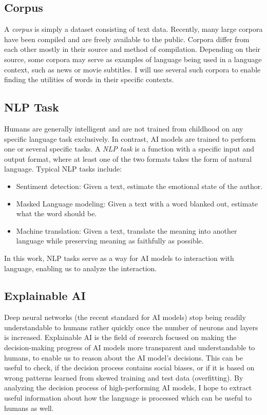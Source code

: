 	\subsection{Corpus}
	      A \textit{corpus} is simply a dataset consisting of text data.
	      Recently, many large corpora have been compiled and are freely available to the public.
	      Corpora differ from each other mostly in their source and method of compilation.
	      Depending on their source, some corpora may serve as examples of language being used in a language context, such as news or movie subtitles.
	      I will use several such corpora to enable finding the utilities of words in their specific contexts.
	\subsection{NLP Task}
	      Humans are generally intelligent and are not trained from childhood on any specific language task exclusively.
	      In contrast, AI models are trained to perform one or several specific tasks.
	      A \textit{NLP task} is a function with a specific input and output format, where at least one of the two formats takes the form of natural language.
	      Typical NLP tasks include:

	      \begin{itemize}
		      \item Sentiment detection: Given a text, estimate the emotional state of the author.
		      \item Masked Language modeling: Given a text with a word blanked out, estimate what the word should be.
		      \item Machine translation: Given a text, translate the meaning into another language while preserving meaning as faithfully as possible.
	      \end{itemize}

	      In this work, NLP tasks serve as a way for AI models to interaction with language, enabling us to analyze the interaction.

	\subsection{Explainable AI}
	      Deep neural networks (the recent standard for AI models) stop being readily understandable to humans rather quickly once the number of neurons and layers is increased.
	      Explainable AI is the field of research focused on making the decision-making progress of AI models more transparent and understandable to humans, to enable us to reason about the AI model's decisions. 
	      This can be useful to check, if the decision process contains social biases, or if it is based on wrong patterns learned from skewed training and test data (overfitting).
	      By analyzing the decision process of high-performing AI models, I hope to extract useful information about how the language is processed which can be useful to humans as well.

